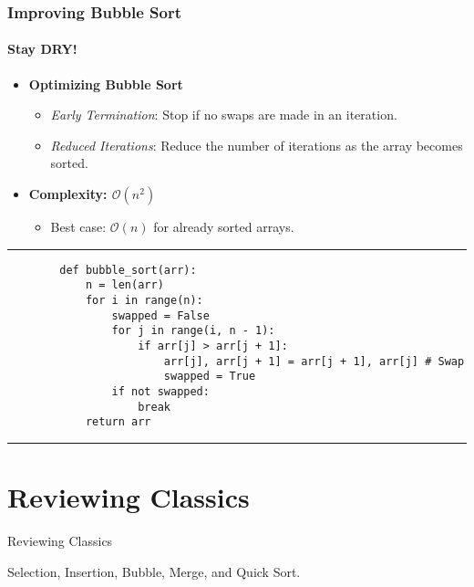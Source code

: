 \documentclass[compress,12pt,bookmark]{beamer}
\begin{document}
\begin{frame}[fragile]
    \frametitle{Improving Bubble Sort}
    \framesubtitle{Stay DRY!}

    \begin{itemize}
        \item \textbf{Optimizing Bubble Sort}
            \begin{itemize}
            \item \textit{Early Termination}: Stop if no swaps are made in an iteration.
            \item \textit{Reduced Iterations}: Reduce the number of iterations as the array becomes sorted.
            \end{itemize}
        \item \textbf{Complexity: \(\mathcal{O}(n^2)\)}
            \begin{itemize}
            \item Best case: \(\mathcal{O}(n)\) for already sorted arrays.
            \end{itemize}
    \end{itemize}

    \rule{\textwidth}{1pt}
    \scriptsize
    \begin{verbatim}
        def bubble_sort(arr):
            n = len(arr)
            for i in range(n):
                swapped = False
                for j in range(i, n - 1):
                    if arr[j] > arr[j + 1]:
                        arr[j], arr[j + 1] = arr[j + 1], arr[j] # Swap
                        swapped = True
                if not swapped:
                    break
            return arr
    \end{verbatim}
    \rule{\textwidth}{1pt}

\end{frame}


\section{Reviewing Classics}

\begin{frame}
    \centering
    \Huge
    Reviewing Classics

    \normalsize
    Selection, Insertion, Bubble, Merge, and Quick Sort.
    \vfill
\end{frame}
\end{document}
